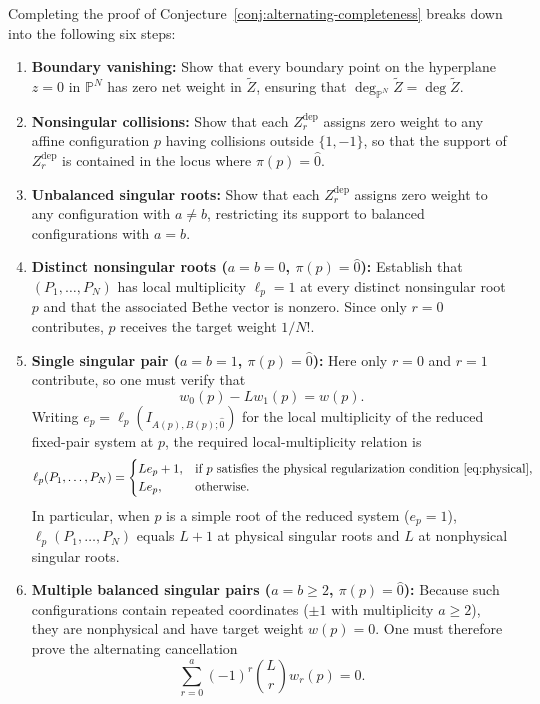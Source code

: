 \documentclass[11pt]{article}
\theoremstyle{definition}
\begin{document}
Completing the proof of Conjecture~\ref{conj:alternating-completeness} breaks down into the following six steps:
\begin{enumerate}
	\item \textbf{Boundary vanishing:} Show that every boundary point on the hyperplane $z=0$ in $\mathbb{P}^N$ has zero net weight in $\tilde{Z}$, ensuring that $\deg_{\mathbb{P}^N}\tilde{Z}=\deg\tilde{Z}$.
	\item \textbf{Nonsingular collisions:} Show that each $Z^{\mathrm{dep}}_r$ assigns zero weight to any affine configuration $p$ having collisions outside $\{1,-1\}$, so that the support of $Z^{\mathrm{dep}}_r$ is contained in the locus where $\pi(p)=\hat{0}$.
	\item \textbf{Unbalanced singular roots:} Show that each $Z^{\mathrm{dep}}_{r}$ assigns zero weight to any configuration with $a\ne b$, restricting its support to balanced configurations with $a=b$.
	\item \textbf{Distinct nonsingular roots ($a=b=0$, $\pi(p)=\hat{0}$):} Establish that $(P_1,\ldots,P_N)$ has local multiplicity $\ell_p=1$ at every distinct nonsingular root $p$ and that the associated Bethe vector is nonzero. Since only $r=0$ contributes, $p$ receives the target weight $1/N!$.
	\item \textbf{Single singular pair ($a=b=1$, $\pi(p)=\hat{0}$):}
	Here only $r=0$ and $r=1$ contribute, so one must verify that
	\begin{equation}\label{eq:singular_weight}
		w_0(p)-Lw_1(p)=w(p).
	\end{equation}
	Writing $e_p=\ell_p(I_{A(p),B(p);\hat{0}})$ for the local multiplicity of the reduced fixed-pair
	system at $p$, the required local-multiplicity relation is
	\begin{equation}\label{eq:single-pair-length-criterion}
		\ell_p(P_1,\ldots,P_N)=
		\begin{cases}
			Le_p+1, & \text{if }p\text{ satisfies the physical regularization condition~\eqref{eq:physical}},\\
			Le_p, & \text{otherwise}.
		\end{cases}
	\end{equation}
	In particular, when $p$ is a simple root of the reduced system ($e_p=1$), $\ell_p(P_1,\ldots,P_N)$ equals $L+1$ at physical singular roots and $L$ at nonphysical singular roots.
	\item \textbf{Multiple balanced singular pairs ($a=b\ge 2$, $\pi(p)=\hat{0}$):}
	Because such configurations contain repeated coordinates ($\pm 1$ with multiplicity $a\ge 2$), they are nonphysical and have target weight $w(p)=0$. One must therefore prove the alternating cancellation
	\[
	\sum_{r=0}^{a}(-1)^r\binom{L}{r} w_r(p)=0.
	\]
\end{enumerate}
\end{document}
